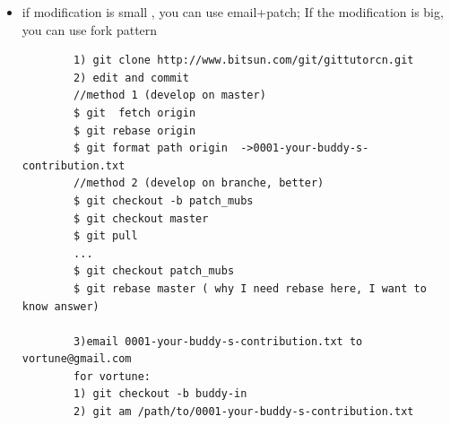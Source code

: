 \documentclass[a4paper,11pt,twoside]{book}
\begin{document}
	
\begin{itemize}
	\item if modification is small , you can use email+patch; If the modification is big, you can use fork pattern
	\begin{verbatim}
		1) git clone http://www.bitsun.com/git/gittutorcn.git
		2) edit and commit
		//method 1 (develop on master)
		$ git  fetch origin
		$ git rebase origin
		$ git format path origin  ->0001-your-buddy-s-contribution.txt
		//method 2 (develop on branche, better)
		$ git checkout -b patch_mubs
		$ git checkout master
		$ git pull
		...
		$ git checkout patch_mubs
		$ git rebase master ( why I need rebase here, I want to know answer)
		
		3)email 0001-your-buddy-s-contribution.txt to vortune@gmail.com
		for vortune:
		1) git checkout -b buddy-in
		2) git am /path/to/0001-your-buddy-s-contribution.txt
	\end{verbatim}
\end{itemize}
\end{document}
